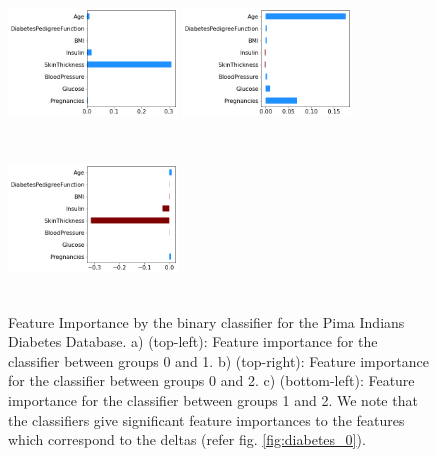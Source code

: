 \begin{figure}
\centering
    \centering
     \includegraphics[width=0.4\textwidth, height=4cm]{images/diabetes/0_.png}
     \includegraphics[width=0.4\textwidth, height=4cm]{images/diabetes/1_.png}
      \includegraphics[width=0.4\textwidth, height=4cm]{images/diabetes/2_.png}
    \caption{Feature Importance by the binary classifier for the Pima Indians Diabetes Database. a) (top-left): Feature importance for the classifier between groups 0 and 1. b) (top-right): Feature importance for the classifier between groups 0 and 2. c) (bottom-left): Feature importance for the classifier between groups 1 and 2. We note that the classifiers give significant feature importances to the features which correspond to the deltas (refer fig. \ref{fig:diabetes_0}).}
    \label{fig:diabetes_1}
\end{figure}